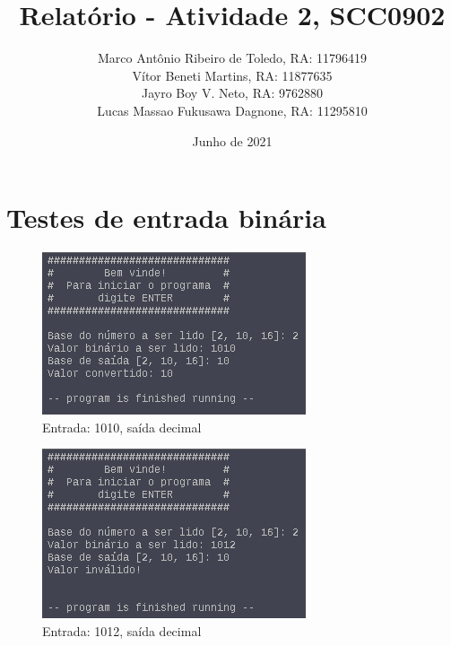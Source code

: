 \documentclass{article}
\title{Relatório - Atividade 2, SCC0902}
\author{
  Marco Antônio Ribeiro de Toledo, RA: 11796419 \\
  Vítor Beneti Martins, RA: 11877635 \\
  Jayro Boy V. Neto, RA: 9762880 \\
  Lucas Massao Fukusawa Dagnone, RA: 11295810
}
\date{Junho de 2021}
\begin{document}
\maketitle

\tableofcontents
\listoffigures

\section{Testes de entrada binária}

\begin{figure}[H]
  \includegraphics[width=\linewidth]{./CasoBin1}
  \caption{Entrada: 1010, saída decimal}
  \label{fig:bin1}
\end{figure}

\begin{figure}[H]
  \includegraphics[width=\linewidth]{./CasoBin2}
  \caption{Entrada: 1012, saída decimal}
  \label{fig:bin2}
\end{figure}
\end{document}
